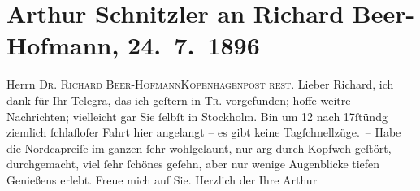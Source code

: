 

               \section[Arthur Schnitzler an Richard Beer-Hofmann, 24. 7. 1896]{ Arthur Schnitzler an Richard Beer-Hofmann,
               24. 7. 1896}\nopagebreak{}\rehead{ }\begin{ledgroupsized}[t]{13cm}\normalsize\beginnumbering{} \toendnotes[C]{\smallbreak\pagebreak[2]} 
\pstart{}{\pb}Herrn \textsc{Dr. Richard
                     Beer-Hofmann}\pend{}\pstart{}\textsc{Kopenhagen}\pend{}\pstart{}\textsc{post rest.}\pend{}{\bigskip}\pstart
           \noindent{}{\pb}Lieber Richard, ich dank für Ihr Telegra{\geminationm}, das ich geſtern in \textsc{Tr}. vorgefunden; hoffe weitre Nachrichten; vielleicht gar Sie ſelbſt in
                  Stockholm. Bin um 12 nach 17ſtündg
               ziemlich ſchlafloſer Fahrt hier angelangt – es gibt keine {\pb}Tagſchnellzüge. – Habe die Nordcapreiſe im ganzen ſehr wohlgelaunt, nur arg durch Kopfweh
               geſtört, durchgemacht, viel ſehr ſchönes geſehn, aber nur wenige Augenblicke tiefen
               Genießens erlebt. Freue mich auf Sie. Herzlich der Ihre \spacefill\mbox{Arthur}\pend
                     \endnumbering{}\end{ledgroupsized}  \newcommand{\dateiname}{L00567}\newcommand{\titel}{Arthur Schnitzler an Richard Beer-Hofmann, 24. 7. 1896}\newcommand{\editorInnen}{Martin Anton Müller und Gerd-Hermann Susen}
      